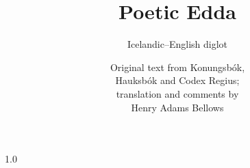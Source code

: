 \documentclass{scrbook}
\newcommand{\tocnumwidth}{5em}
\newcommand{\tocspacing}{1.0} %
\newcommand{\tocmarginwidth}{2.55em} %
\newcommand{\titlesize}{48pt}
\newcommand{\tocnumwidth}{5em}
\newcommand{\tocspacing}{0.9} %
\newcommand{\tocmarginwidth}{2.55em} %
\newcommand{\tocnumwidth}{5em}
\newcommand{\tocspacing}{0.9}
\newcommand{\tocmarginwidth}{2.55em} %
\newcommand{\ndash}{--}
\begin{document}
\title{\fontsize{\titlesize}{\titlesize}\selectfont Poetic Edda}
\subtitle{\Large{Icelandic{\ndash}English diglot}}
\author{
Original text from Konungsbók, \\
Hauksbók and Codex Regius; \\
translation and comments by \\
Henry Adams Bellows
}

\date{}
\publishers{\small{Typeset by Bogdan Opanchuk, \\ compiled on \today \\ Melbourne, Australia}}

\maketitle

\frontmatter

\clearpage
\begingroup

	\pagestyle{empty}
	\renewcommand*{\chapterpagestyle}{empty}

	\renewcommand{\@pnumwidth}{\tocnumwidth}
	\renewcommand{\@tocrmarg}{\tocmarginwidth plus1fil} %

	\begin{spacing}{\tocspacing}
	\tableofcontents
	\end{spacing}

\clearpage
\endgroup

\mainmatter

\end{document}
